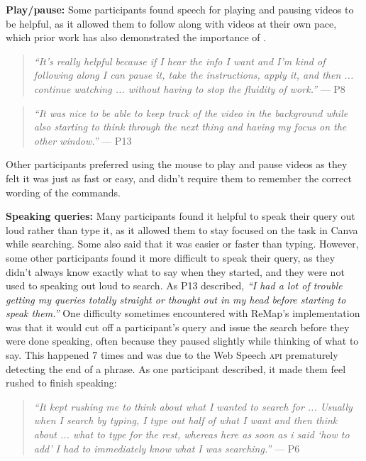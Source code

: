 \textbf{Play/pause:}
Some participants found speech for playing and pausing videos to be helpful, as it allowed them to follow along with videos at their own pace, which prior work has also demonstrated the importance of \cite{Chang2019, Pongnumkul2011}.

\begin{quote}
\textit{``It's really helpful because if I hear the info I want and I'm kind of following along I can pause it, take the instructions, apply it, and then ... continue watching ... without having to stop the fluidity of work.''} --- P8
\end{quote}
\begin{quote}
\textit{``It was nice to be able to keep track of the video in the background while also starting to think through the next thing and having my focus on the other window.''} --- P13
\end{quote}

Other participants preferred using the mouse to play and pause videos as they felt it was just as fast or easy, and didn't require them to remember the correct wording of the commands.

\textbf{Speaking queries:}
Many participants found it helpful to speak their query out loud rather than type it, as it allowed them to stay focused on the task in Canva while searching. Some also said that it was easier or faster than typing. However, some other participants found it more difficult to speak their query, as they didn't always know exactly what to say when they started, and they were not used to speaking out loud to search. As P13 described, \textit{``I had a lot of trouble getting my queries totally straight or thought out in my head before starting to speak them.''} One difficulty sometimes encountered with ReMap's implementation was that it would cut off a participant's query and issue the search before they were done speaking, often because they paused slightly while thinking of what to say. This happened 7 times and was due to the Web Speech \textsc{api} prematurely detecting the end of a phrase. As one participant described, it made them feel rushed to finish speaking:

\begin{quote}
\textit{``It kept rushing me to think about what I wanted to search for ... Usually when I search by typing, I type out half of what I want and then think about ... what to type for the rest, whereas here as soon as i said `how to add' I had to immediately know what I was searching.''} --- P6
\end{quote}

